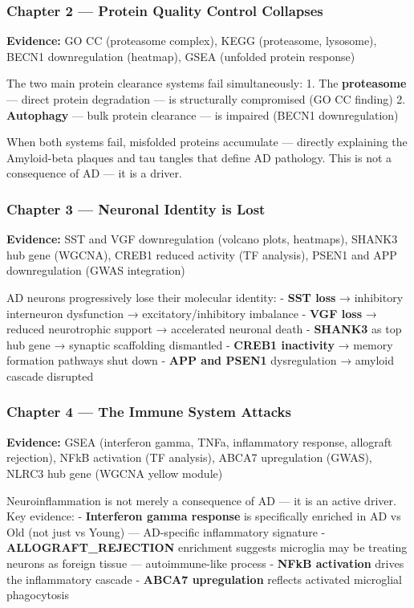 \documentclass[
]{article}
\begin{document}
\subsubsection{Chapter 2 --- Protein Quality Control
Collapses}\label{chapter-2-protein-quality-control-collapses}

\textbf{Evidence:} GO CC (proteasome complex), KEGG (proteasome,
lysosome), BECN1 downregulation (heatmap), GSEA (unfolded protein
response)

The two main protein clearance systems fail simultaneously: 1. The
\textbf{proteasome} --- direct protein degradation --- is structurally
compromised (GO CC finding) 2. \textbf{Autophagy} --- bulk protein
clearance --- is impaired (BECN1 downregulation)

When both systems fail, misfolded proteins accumulate --- directly
explaining the Amyloid-beta plaques and tau tangles that define AD
pathology. This is not a consequence of AD --- it is a driver.

\subsubsection{Chapter 3 --- Neuronal Identity is
Lost}\label{chapter-3-neuronal-identity-is-lost}

\textbf{Evidence:} SST and VGF downregulation (volcano plots, heatmaps),
SHANK3 hub gene (WGCNA), CREB1 reduced activity (TF analysis), PSEN1 and
APP downregulation (GWAS integration)

AD neurons progressively lose their molecular identity: - \textbf{SST
loss} → inhibitory interneuron dysfunction → excitatory/inhibitory
imbalance - \textbf{VGF loss} → reduced neurotrophic support →
accelerated neuronal death - \textbf{SHANK3} as top hub gene → synaptic
scaffolding dismantled - \textbf{CREB1 inactivity} → memory formation
pathways shut down - \textbf{APP and PSEN1} dysregulation → amyloid
cascade disrupted

\subsubsection{Chapter 4 --- The Immune System
Attacks}\label{chapter-4-the-immune-system-attacks}

\textbf{Evidence:} GSEA (interferon gamma, TNFa, inflammatory response,
allograft rejection), NFkB activation (TF analysis), ABCA7 upregulation
(GWAS), NLRC3 hub gene (WGCNA yellow module)

Neuroinflammation is not merely a consequence of AD --- it is an active
driver. Key evidence: - \textbf{Interferon gamma response} is
specifically enriched in AD vs Old (not just vs Young) --- AD-specific
inflammatory signature - \textbf{ALLOGRAFT\_REJECTION} enrichment
suggests microglia may be treating neurons as foreign tissue ---
autoimmune-like process - \textbf{NFkB activation} drives the
inflammatory cascade - \textbf{ABCA7 upregulation} reflects activated
microglial phagocytosis
\end{document}
